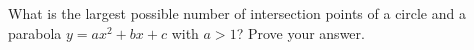 What is the largest possible number of intersection points of a circle and a parabola $y=ax^2+bx+c$ with $a>1$? Prove your answer.
